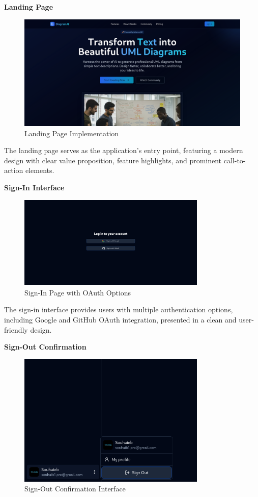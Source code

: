 \textbf{Landing Page}
\begin{figure}[H]
    \centering
    \includegraphics[width=1.0\textwidth]{screenshots/landing.png}
    \caption{Landing Page Implementation}
    \label{fig:landing_page}
\end{figure}

The landing page serves as the application's entry point, featuring a modern design with clear value proposition, feature highlights, and prominent call-to-action elements.

\textbf{Sign-In Interface}
\begin{figure}[H]
    \centering
    \includegraphics[width=0.8\textwidth]{screenshots/signin.png}
    \caption{Sign-In Page with OAuth Options}
    \label{fig:signin_page}
\end{figure}

The sign-in interface provides users with multiple authentication options, including Google and GitHub OAuth integration, presented in a clean and user-friendly design.

\textbf{Sign-Out Confirmation}
\begin{figure}[H]
    \centering
    \includegraphics[width=0.8\textwidth]{screenshots/sign-out.png}
    \caption{Sign-Out Confirmation Interface}
    \label{fig:signout_page}
\end{figure}

